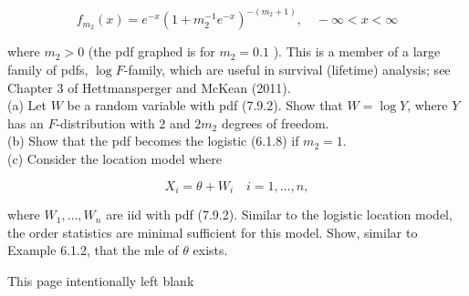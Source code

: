 \begin{equation*}
f_{m_{2}}(x)=e^{-x}\left(1+m_{2}^{-1} e^{-x}\right)^{-\left(m_{2}+1\right)}, \quad-\infty<x<\infty \tag{7.9.2}
\end{equation*}


where $m_{2}>0$ (the pdf graphed is for $m_{2}=0.1$ ). This is a member of a large family of pdfs, $\log F$-family, which are useful in survival (lifetime) analysis; see Chapter 3 of Hettmansperger and McKean (2011).\\
(a) Let $W$ be a random variable with pdf (7.9.2). Show that $W=\log Y$, where $Y$ has an $F$-distribution with 2 and $2 m_{2}$ degrees of freedom.\\
(b) Show that the pdf becomes the logistic (6.1.8) if $m_{2}=1$.\\
(c) Consider the location model where

$$
X_{i}=\theta+W_{i} \quad i=1, \ldots, n,
$$

where $W_{1}, \ldots, W_{n}$ are iid with pdf (7.9.2). Similar to the logistic location model, the order statistics are minimal sufficient for this model. Show, similar to Example 6.1.2, that the mle of $\theta$ exists.

This page intentionally left blank
